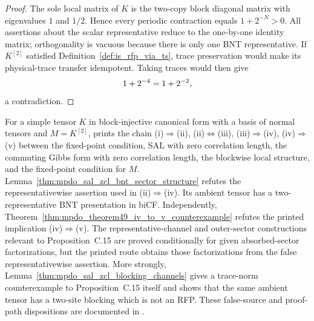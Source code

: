\begin{proof}
    \leanok
    The sole local matrix of $K$ is the two-copy block diagonal matrix with
    eigenvalues $1$ and $1/2$. Hence every periodic contraction equals
    $1+2^{-N}>0$. All assertions about the scalar representative reduce to
    the one-by-one identity matrix; orthogonality is vacuous because there is
    only one BNT representative. If $K^{[2]}$ satisfied
    Definition~\ref{def:is_rfp_via_ts}, trace preservation would make its
    physical-trace transfer idempotent. Taking traces would then give
    \begin{align}
        1+2^{-4}=1+2^{-2},
        \notag
    \end{align}
    a contradiction.
\end{proof}

\begin{remark}
    \label{thm:cpsv_theorem49_printed_status}
    For a simple tensor $K$ in block-injective canonical form with a basis of
    normal tensors and $M=K^{[2]}$,
    \cite[Theorem~4.9]{Cirac2016MPDO_arXiv} prints the chain
    (i)$\Rightarrow$(ii), (ii)$\Leftrightarrow$(iii), (iii)$\Rightarrow$(iv),
    (iv)$\Rightarrow$(v) between the fixed-point condition, SAL with zero
    correlation length, the commuting Gibbs form with zero correlation length,
    the blockwise local structure, and the fixed-point condition for $M$.
    Lemma~\ref{thm:mpdo_sal_zcl_bnt_sector_structure} refutes the
    representativewise assertion used in (ii)$\Rightarrow$(iv). Its ambient
    tensor has a two-representative BNT presentation in biCF. Independently,
    Theorem~\ref{thm:mpdo_theorem49_iv_to_v_counterexample} refutes the printed
    implication (iv)$\Rightarrow$(v). The representative-channel and
    outer-sector constructions relevant to Proposition~C.15 are proved
    conditionally for given absorbed-sector factorizations, but the printed
    route obtains those factorizations from the false representativewise
    assertion. More strongly,
    Lemma~\ref{thm:mpdo_sal_zcl_blocking_channels} gives a trace-norm
    counterexample to Proposition~C.15 itself and shows that the same ambient
    tensor has a two-site blocking which is not an RFP. These false-source and
    proof-path dispositions are documented in
    \cite{gap:cpgsv17_pf_rank_one,
        gap:cpsv16_prop_c15_blocking_channel_false}.
\end{remark}

